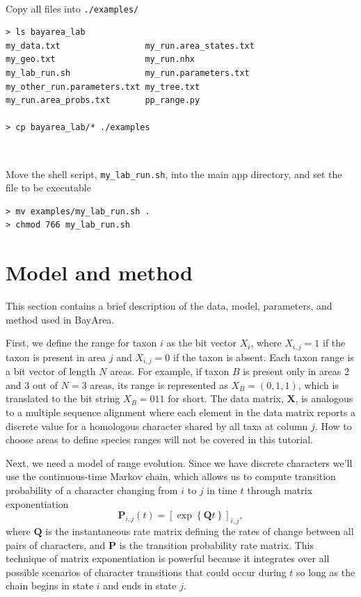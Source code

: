 \documentclass[11pt]{article}
\newcommand{\impmark}{\strut\vadjust{\domark}}
\newcommand{\domark}{%
  \vbox to 0pt{
    \kern-\dp\strutbox
    \smash{\llap{$\rightarrow$\kern1em}}
    \vss
  }%
}
\begin{document}
\noindent \\ \impmark Copy all files into \texttt{./examples/}

\begin{framed}
\begin{lstlisting}
> ls bayarea_lab
my_data.txt                 my_run.area_states.txt
my_geo.txt                  my_run.nhx
my_lab_run.sh               my_run.parameters.txt
my_other_run.parameters.txt my_tree.txt
my_run.area_probs.txt       pp_range.py

> cp bayarea_lab/* ./examples
\end{lstlisting}
\end{framed}

\noindent \\ \impmark Move the shell script, \texttt{my\_lab\_run.sh}, into the main app directory, and set the file to be executable

\begin{framed}
\begin{lstlisting}
> mv examples/my_lab_run.sh .
> chmod 766 my_lab_run.sh
\end{lstlisting}
\end{framed}

\section{Model and method}


This section contains a brief description of the data, model, parameters, and method used in BayArea.

First, we define the range for taxon $i$ as the bit vector $X_i$, where $X_{i,j} = 1$ if the taxon is present in area $j$ and $X_{i,j} = 0$ if the taxon is absent.
Each taxon range is a bit vector of length $N$ areas.
For example, if taxon $B$ is present only in areas 2 and 3 out of $N=3$ areas, its range is represented as $X_B = (0,1,1)$, which is translated to the bit string $X_B=011$ for short.
The data matrix, $\textbf{X}$, is analogous to a multiple sequence alignment where each element in the data matrix reports a discrete value for a homologous character shared by all taxa at column $j$.
How to choose areas to define species ranges will not be covered in this tutorial.

Next, we need a model of range evolution.
Since we have discrete characters we'll use the continuous-time Markov chain, which allows us to compute transition probability of a character changing from $i$ to $j$ in time $t$ through matrix exponentiation
\[
\mathbf{P}_{i,j}(t) = \left[ \exp \left\lbrace \mathbf{Q}t \right\rbrace \right]_{i,j},
\]
where $\textbf{Q}$ is the instantaneous rate matrix defining the rates of change between all pairs of characters, and $\textbf{P}$ is the transition probability rate matrix.
This technique of matrix exponentiation is powerful because it integrates over all possible scenarios of character transitions that could occur during $t$ so long as the chain begins in state $i$ and ends in state $j$.
\end{document}
